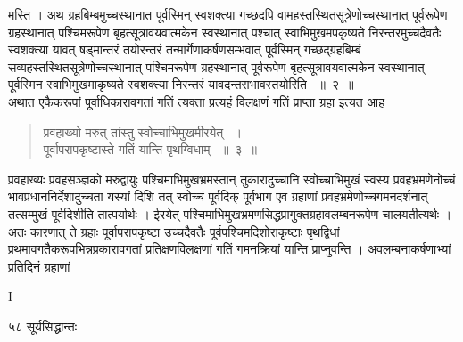 \documentclass[11pt, openany]{book}
\begin{document}
\begin{sloppypar}
\noindent मस्ति । अथ ग्रहबिम्बमुच्चस्थानात पूर्वस्मिन् स्वशक्त्या गच्छदपि वामहस्तस्थितसूत्रेणोच्चस्थानात् पूर्वरूपेण ग्रहस्थानात् पश्चिमरूपेण बृहत्सूत्रावयवात्मकेन स्वस्थानात् पश्चात् स्वाभिमुखमपकृष्यते निरन्तरमुच्चदैवतैः स्वशक्त्या यावत् षड्मान्तरं तयोरन्तरं तन्मार्गेणाकर्षणसम्भवात् पूर्वस्मिन् गच्छद्ग्रहबिम्बं सव्यहस्तस्थितसूत्रेणोच्चस्थानात् पश्चिमरूपेण ग्रहस्थानात् पूर्वरूपेण बृहत्सूत्रावयवात्मकेन स्वस्थानात् पूर्वस्मिन स्वाभिमुखमाकृष्यते स्वशक्त्या निरन्तरं यावदन्तराभावस्तयोरिति ~॥~२~॥\\
\noindent अथात एकैकरूपां पूर्वाधिकारावगतां गतिं त्यक्ता प्रत्यहं विलक्षणं गतिं प्राप्ता ग्रहा इत्यत आह\textendash
\end{sloppypar}
\begin{quote}

{\ssi प्रवहाख्यो मरुत् तांस्तु स्वोच्चाभिमुखमीरयेत् ~।\\
पूर्वापरापकृष्टास्ते गतिं यान्ति पृथग्विधाम् ~॥~३~॥}
\end{quote}
\begin{sloppypar}
प्रवहाख्यः प्रवहसञ्ज्ञको मरुद्वायुः पश्चिमाभिमुखभ्रमस्तान् तुकारादुच्चानि स्वोच्चाभिमुखं स्वस्य प्रवहभ्रमणेनोच्चं भावप्रधाननिर्देशादुच्चता यस्यां दिशि तत् स्वोच्चं पूर्वदिक् पूर्वभाग एव ग्रहाणां प्रवहभ्रमेणोच्चगमनदर्शनात् तत्सम्मुखं पूर्वदिशीति तात्पर्यार्थः । ईरयेत् पश्चिमाभिमुखभ्रमणसिद्धप्रागुक्तग्रहावलम्बनरूपेण चालयतीत्यर्थः । अतः कारणात् ते ग्रहाः पूर्वापरापकृष्टा उच्चदैवतैः पूर्वपश्चिमदिशोराकृष्टाः पृथद्विधां प्रथमावगतैकरूपभिन्नप्रकारावगतां प्रतिक्षणविलक्षणां गतिं गमनक्रियां यान्ति प्राप्नुवन्ति । अवलम्बनाकर्षणाभ्यां प्रतिदिनं ग्रहाणां 
\end{sloppypar}

{\tiny{I}}

\newpage

\noindent ५८ \hspace{4cm} सूर्यसिद्धान्तः
\vspace{1cm}
\end{document}
